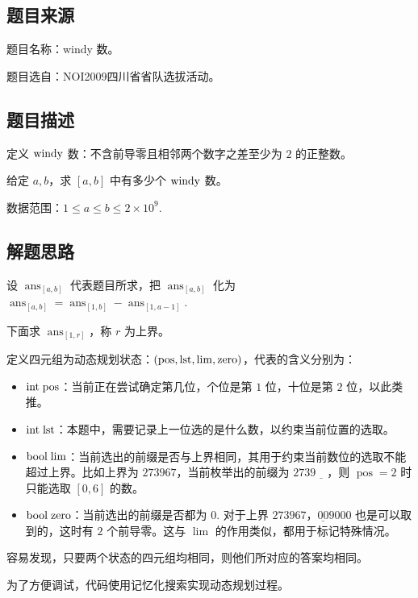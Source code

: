 \subsection{题目来源}

题目名称：windy 数。

题目选自：NOI2009四川省省队选拔活动。

\subsection{题目描述}

定义 \(\rm{windy}\) 数：不含前导零且相邻两个数字之差至少为 \(2\)
的正整数。

给定 \(a,b\)，求 \([a,b]\) 中有多少个 \(\rm{windy}\) 数。

数据范围：\(1\leq a\leq b\leq 2\times 10^9\).

\subsection{解题思路}

设 \(\operatorname{ans}_{[a,b]}\) 代表题目所求，把
\(\operatorname{ans}_{[a,b]}\) 化为
\(\operatorname{ans}_{[a,b]}=\operatorname{ans}_{[1,b]}-\operatorname{ans}_{[1,a-1]}\).

下面求 \(\operatorname{ans}_{[1,r]}\)，称 \(r\) 为上界。

定义四元组为动态规划状态：\(\rm{(pos,lst,lim,zero)}\)，代表的含义分别为：

\begin{itemize}
\item
  \(\rm{int\;pos}\)：当前正在尝试确定第几位，个位是第 \(1\) 位，十位是第
  \(2\) 位，以此类推。
\item
  \(\rm{int \;lst}\)：本题中，需要记录上一位选的是什么数，以约束当前位置的选取。
\item
  \(\rm{bool\;lim}\)：当前选出的前缀是否与上界相同，其用于约束当前数位的选取不能超过上界。比如上界为
  \(273967\)，当前枚举出的前缀为 \(2739\underline{\quad}\)，则
  \(\operatorname{pos}=2\) 时只能选取 \([0,6]\) 的数。
\item
  \(\rm{bool\;zero}\)：当前选出的前缀是否都为 \(0\). 对于上界
  \(273967\)，\(\underline{00}9000\) 也是可以取到的，这时有 \(2\)
  个前导零。这与 \(\operatorname{lim}\) 的作用类似，都用于标记特殊情况。
\end{itemize}

容易发现，只要两个状态的四元组均相同，则他们所对应的答案均相同。

为了方便调试，代码使用记忆化搜索实现动态规划过程。

